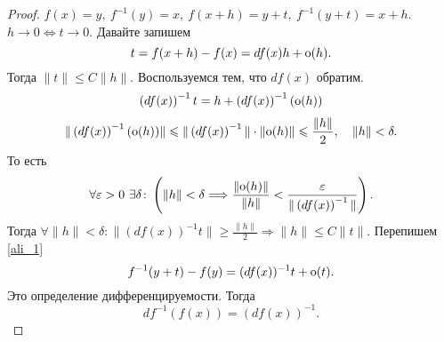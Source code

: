 \begin{description}
\begin{proof}
	    $ f(x) = y,~ f^{-1}(y) = x, ~f(x +h) = y + t, ~ f^{-1}(y+t) = x +h$. $ h \to  0 \Longleftrightarrow t \to  0$.
	    Давайте запишем
	    \[
		t = f(x +h) - f(x) = df(x)h + {\mathop{\text{\rm o}}}(h)
	    .\] 
	    Тогда $ \| t \|  \le C \| h \| $.
	    Воспользуемся тем, что $df(x)$ обратим.
	    \begin{align}\label{ali_1}
		\left( df(x) \right)^{-1} t = h + \left( df(x) \right)^{-1} \left( {\mathop{\text{\rm o}}}(h) \right) 
	    \end{align}
	    \[
		\| \left( df(x) \right)^{-1}({\mathop{\text{\rm o}}}(h)) \|  \leqslant  \| \left( df(x) \right)^{-1} \| \cdot \| {\mathop{\text{\rm o}}}(h) \| \leqslant \frac{\| h \| }{2}, \quad \| h \|  < \delta  
	    .\] 
	    То есть
\[
    \forall  \varepsilon  >0 ~ \exists \delta \colon \left( \|  h \| < \delta  \Longrightarrow \frac{\| {\mathop{\text{\rm o}}}(h) \| }{\| h \| } < \frac{ \varepsilon }{\| \left( df(x) \right)^{-1} \| }\right)
.\] 
Тогда $ \forall  \| h \|  < \delta \colon \| (df(x))^{-1}t \| \ge \frac{\| h \| }{2} \Longrightarrow \| h \| \le C \| t \|  $.
Перепишем \ref{ali_1}
\[
    f^{-1} (y+t) - f(y) = (df(x))^{-1} t + {\mathop{\text{\rm o}}}(t)
.\] 
Это определение дифференцируемости.
Тогда 
\[
    df^{-1}(f(x)) = (df(x))^{-1}
.\] 
	\end{proof}
\end{description}
